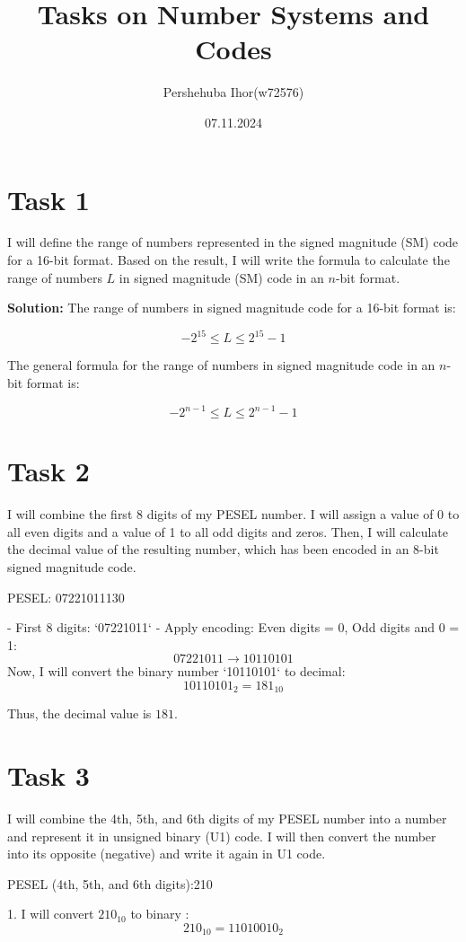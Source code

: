 \documentclass{article}
\title{Tasks on Number Systems and Codes}
\author{Pershehuba Ihor(w72576)}
\date{07.11.2024}
\begin{document}
\maketitle

\section*{Task 1}
I will define the range of numbers represented in the signed magnitude (SM) code for a 16-bit format. Based on the result, I will write the formula to calculate the range of numbers \( L \) in signed magnitude (SM) code in an \( n \)-bit format.

\textbf{Solution:}  
The range of numbers in signed magnitude code for a 16-bit format is:

\[
-2^{15} \leq L \leq 2^{15} - 1
\]

The general formula for the range of numbers in signed magnitude code in an \( n \)-bit format is:

\[
-2^{n-1} \leq L \leq 2^{n-1} - 1
\]

\section*{Task 2}
I will combine the first 8 digits of my PESEL number. I will assign a value of 0 to all even digits and a value of 1 to all odd digits and zeros. Then, I will calculate the decimal value of the resulting number, which has been encoded in an 8-bit signed magnitude code.

PESEL: 07221011130

- First 8 digits: `07221011`
- Apply encoding: Even digits = 0, Odd digits and 0 = 1:
\[
07221011 \rightarrow 10110101
\]
Now, I will convert the binary number `10110101` to decimal:
\[
10110101_2 = 181_{10}
\]

Thus, the decimal value is \( 181 \).

\section*{Task 3}
I will combine the 4th, 5th, and 6th digits of my PESEL number into a number and represent it in unsigned binary (U1) code. I will then convert the number into its opposite (negative) and write it again in U1 code.

PESEL (4th, 5th, and 6th digits):210

1. I will convert \( 210_{10} \) to binary :
   \[
   210_{10} = 11010010_2
   \]
\end{document}
